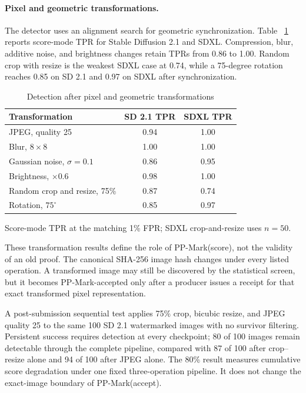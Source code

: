 \paragraph{Pixel and geometric transformations.}
The detector uses an alignment search for geometric synchronization.  Table
~\ref{tab:ch4-transformations} reports score-mode TPR for Stable Diffusion 2.1 and
SDXL.  Compression, blur, additive noise, and brightness changes retain TPRs from
0.86 to 1.00.  Random crop with resize is the weakest SDXL case at 0.74, while a
75-degree rotation reaches 0.85 on SD 2.1 and 0.97 on SDXL after synchronization.

\begin{table}[H]
    \centering
    \caption{Detection after pixel and geometric transformations}
    \label{tab:ch4-transformations}
    \small
    \setlength{\tabcolsep}{12pt}
    \renewcommand{\arraystretch}{1.15}
    \begin{tabular}{@{}lcc@{}}
        \toprule
        Transformation & SD 2.1 TPR & SDXL TPR \\
        \midrule
        JPEG, quality 25            & 0.94 & 1.00 \\
        Blur, \(8\times8\)          & 1.00 & 1.00 \\
        Gaussian noise, \(\sigma=0.1\) & 0.86 & 0.95 \\
        Brightness, \(\times0.6\)   & 0.98 & 1.00 \\
        Random crop and resize, 75\% & 0.87 & 0.74 \\
        Rotation, \(75^{\circ}\)    & 0.85 & 0.97 \\
        \bottomrule
    \end{tabular}

    \vspace{2pt}
    \parbox{0.92\textwidth}{\footnotesize
    Score-mode TPR at the matching 1\% FPR; SDXL crop-and-resize uses \(n=50\).}
\end{table}

These transformation results define the role of PP-Mark(score), not the validity
of an old proof.  The canonical SHA-256 image hash changes under every listed
operation.  A transformed image may still be discovered by the statistical
screen, but it becomes PP-Mark-accepted only after a producer issues a receipt for
that exact transformed pixel representation.

A post-submission sequential test applies 75\% crop, bicubic resize, and JPEG
quality 25 to the same 100 SD 2.1 watermarked images with no survivor filtering.
Persistent success requires detection at every checkpoint; 80 of 100 images remain
detectable through the complete pipeline, compared with 87 of 100 after crop--
resize alone and 94 of 100 after JPEG alone.  The 80\% result measures cumulative
score degradation under one fixed three-operation pipeline.  It does not change
the exact-image boundary of PP-Mark(accept).

